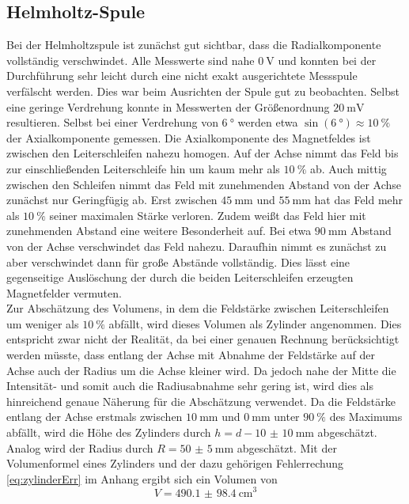 \subsection{Helmholtz-Spule}
Bei der Helmholtzspule ist zunächst gut sichtbar, dass die Radialkomponente vollständig verschwindet. Alle Messwerte sind nahe $ \SI{0}{\volt} $ und konnten bei der Durchführung sehr leicht durch eine nicht exakt ausgerichtete Messspule verfälscht werden. Dies war beim Ausrichten der Spule gut zu beobachten. Selbst eine geringe Verdrehung konnte in Messwerten der Größenordnung $ \SI{20}{\milli\volt} $ resultieren. Selbst bei einer Verdrehung von $ \SI{6}{\degree} $ werden etwa $ \sin(\SI{6}{\degree}) \approx \SI{10}{\percent} $ der Axialkomponente gemessen.
Die Axialkomponente des Magnetfeldes ist zwischen den Leiterschleifen nahezu homogen. Auf der Achse nimmt das Feld bis zur einschließenden Leiterschleife hin um kaum mehr als $ \SI{10}{\percent} $ ab. Auch mittig zwischen den Schleifen nimmt das Feld mit zunehmenden Abstand von der Achse zunächst nur Geringfügig ab. Erst zwischen $ \SI{45}{\milli\meter} $ und $ \SI{55}{\milli\meter} $ hat das Feld mehr als $ \SI{10}{\percent} $ seiner maximalen Stärke verloren. Zudem weißt das Feld hier mit zunehmenden Abstand eine weitere Besonderheit auf. Bei etwa $ \SI{90}{\milli\meter} $ Abstand von der Achse verschwindet das Feld nahezu. Daraufhin nimmt es zunächst zu aber verschwindet dann für große Abstände vollständig. Dies lässt eine gegenseitige Auslöschung der durch die beiden Leiterschleifen erzeugten Magnetfelder vermuten. \\
Zur Abschätzung des Volumens, in dem die Feldstärke zwischen Leiterschleifen um weniger als $ \SI{10}{\percent} $ abfällt, wird dieses Volumen als Zylinder angenommen. Dies entspricht zwar nicht der Realität, da bei einer genauen Rechnung berücksichtigt werden müsste, dass entlang der Achse mit Abnahme der Feldstärke auf der Achse auch der Radius um die Achse kleiner wird. Da jedoch nahe der Mitte die Intensität- und somit auch die Radiusabnahme sehr gering ist, wird dies als hinreichend genaue Näherung für die Abschätzung verwendet. Da die Feldstärke entlang der Achse erstmals zwischen $ \SI{10}{\mm} $ und $ \SI{0}{\mm} $ unter $ \SI{90}{\percent} $ des Maximums abfällt, wird die Höhe des Zylinders durch $ h = d - \SI{10(10)}{\mm} $ abgeschätzt. Analog wird der Radius durch $ R = \SI{50(5)}{\mm} $ abgeschätzt. Mit der Volumenformel eines Zylinders und der dazu gehörigen Fehlerrechung \eqref{eq:zylinderErr} im Anhang ergibt sich ein Volumen von
\begin{equation*}
	V = \SI{490.1(984)}{\cubic\cm}
\end{equation*}

